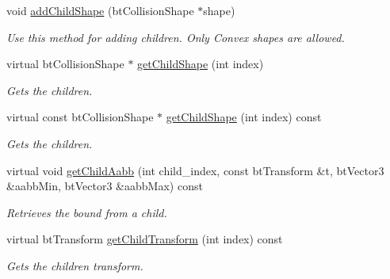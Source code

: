 \begin{DoxyCompactItemize}
void \hyperlink{classbtGImpactCompoundShape_a106e3d9999c847a9748c962378ab3f46}{add\+Child\+Shape} (bt\+Collision\+Shape $\ast$shape)
\begin{DoxyCompactList}\small\item\em Use this method for adding children. Only Convex shapes are allowed. \end{DoxyCompactList}\item 
\mbox{\label{classbtGImpactCompoundShape_a91310884e33cfa7dc25d803ffb577ac0}} 
virtual bt\+Collision\+Shape $\ast$ \hyperlink{classbtGImpactCompoundShape_a91310884e33cfa7dc25d803ffb577ac0}{get\+Child\+Shape} (int index)
\begin{DoxyCompactList}\small\item\em Gets the children. \end{DoxyCompactList}\item 
\mbox{\label{classbtGImpactCompoundShape_a26b37689fa96844fabdba83be64a2cce}} 
virtual const bt\+Collision\+Shape $\ast$ \hyperlink{classbtGImpactCompoundShape_a26b37689fa96844fabdba83be64a2cce}{get\+Child\+Shape} (int index) const
\begin{DoxyCompactList}\small\item\em Gets the children. \end{DoxyCompactList}\item 
\mbox{\label{classbtGImpactCompoundShape_ad5aab7d8e9258c3d0df2b6b5d7313b0f}} 
virtual void \hyperlink{classbtGImpactCompoundShape_ad5aab7d8e9258c3d0df2b6b5d7313b0f}{get\+Child\+Aabb} (int child\+\_\+index, const bt\+Transform \&t, bt\+Vector3 \&aabb\+Min, bt\+Vector3 \&aabb\+Max) const
\begin{DoxyCompactList}\small\item\em Retrieves the bound from a child. \end{DoxyCompactList}\item 
\mbox{\label{classbtGImpactCompoundShape_ac322cfe8338bb24d56f6690fb488789f}} 
virtual bt\+Transform \hyperlink{classbtGImpactCompoundShape_ac322cfe8338bb24d56f6690fb488789f}{get\+Child\+Transform} (int index) const
\begin{DoxyCompactList}\small\item\em Gets the children transform. \end{DoxyCompactList}\item 

\end{DoxyCompactItemize}
